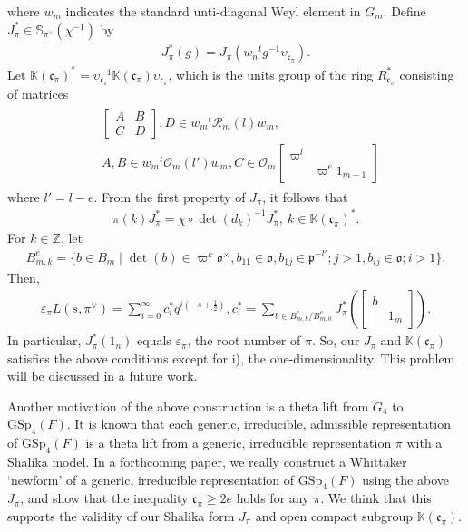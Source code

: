 \documentclass[11pt]{amsart}
\newcommand\ep{\varepsilon}%
\newcommand\Vp{\varpi}%
\newcommand\vp{\varphi}%
\newcommand\oo{\mathfrak{o}}
\newcommand\p{{\mathfrak{p}}}
\newcommand\cf{{\mathfrak{c}}}
\newcommand\Z{{\mathbb{Z}}}
\newcommand\K{{\mathbb{K}}}
\newcommand\Sb{{\mathbb{S}}}
\newcommand\Rc{{\mathcal{R}}}
\newcommand\Oc{{\mathcal{O}}}
\newcommand\1{\mathbf{1}}
\newcommand\GSp{{\mathrm{GSp}}}
\newcommand\tm{\times}
\numberwithin{equation}{section}
\begin{document}
where $w_m$ indicates the standard unti-diagonal Weyl element in $G_m$.
Define $J_\pi^* \in \Sb_{\pi^\vee}(\chi^{-1})$ by
\begin{align*}
J_\pi^*(g) = J_\pi(w_{n} {}^tg^{-1} \upsilon_{\cf_\pi}).
\end{align*} 
Let $\K(\cf_\pi)^* = \upsilon_{\cf_\pi}^{-1} \K(\cf_\pi) \upsilon_{\cf_\pi}$, which is the units group of the ring $R_{\cf_\pi}^*$ consisting of matrices 
\begin{align}
\begin{split}
& \begin{bmatrix}
A & B  \\
C& D
\end{bmatrix},  D \in w_m{}^t\Rc_m(l)w_m, \\ & A, B \in w_m{}^t\Oc_m(l')w_m,  C \in \Oc_m\begin{bmatrix}
\Vp^l &  \\
& \Vp^e 1_{m-1}
\end{bmatrix}
\end{split}\label{eq:Rc*}
\end{align} 
where $l' = l-e$. 
From the first property of $J_\pi$, it follows that 
\begin{align*} 
\pi(k)J_\pi^* = \chi \circ \det(d_k)^{-1} J_\pi^*, \ k \in \K(\cf_\pi)^*.
\end{align*}
For $k \in \Z$, let 
\begin{align*}
B_{m,k}^e = \{b \in B_m \mid \det(b) \in \Vp^k \oo^\tm, b_{11} \in \oo, b_{1j} \in \p^{-l'}; j >1 , b_{ij} \in \oo; i>1 \}.
\end{align*} 
Then, 
\begin{align*}
\ep_\pi L(s,\pi^\vee) = \sum_{i = 0}^\infty c_i^* q^{i(-s+\frac{1}{2})}, c_i^* = \sum_{b \in B_{m,k}^e/B_{m,0}^e} J_\pi^*(\begin{bmatrix}
b &  \\
& 1_m
\end{bmatrix}).
\end{align*} 
In particular, $J_\pi^*(1_n)$ equals $\ep_\pi$, the root number of $\pi$.
So, our $J_\pi$ and $\K(\cf_\pi)$ satisfies the above conditions except for i), the one-dimensionality.
This problem will be discussed in a future work.

Another motivation of the above construction is a theta lift from $G_4$ to $\GSp_4(F)$.
It is known that each generic, irreducible, admissible representation of $\GSp_4(F)$ is a theta lift from a generic, irreducible representation $\pi$ with a Shalika model.
In a forthcoming paper, we really construct a Whittaker `newform' of a generic, irreducible representation of $\GSp_4(F)$ using the above $J_\pi$, and show that the inequality $\cf_\pi \ge 2e$ holds for any $\pi$.
We think that this supports the validity of our Shalika form $J_\pi$ and open compact subgroup $\K(\cf_\pi)$.
\end{document}
